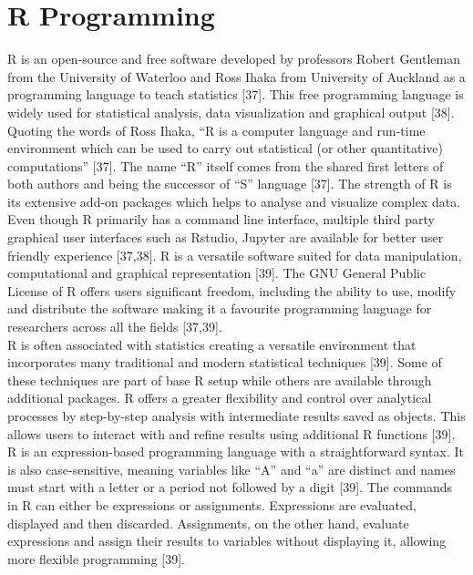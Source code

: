 \documentclass[12pt,a4paper]{article}
\begin{document}
\section{R Programming}
R is an open-source and free software developed by professors Robert Gentleman from the University of Waterloo and Ross Ihaka from University of Auckland as a programming language to teach statistics [37]. This free programming language 
is widely used for statistical analysis, data visualization and graphical output [38]. Quoting the words of Ross Ihaka, “R is a computer language and run-time environment which can be used to carry out statistical (or other quantitative) computations” [37]. 
The name “R” itself comes from the shared first letters of both authors and being the successor of “S” language [37]. The strength of R is its extensive add-on packages which helps to analyse and visualize complex data. Even though R primarily has a command 
line interface, multiple third party graphical user interfaces such as Rstudio, Jupyter are available for better user friendly experience [37,38]. R is a versatile software suited for data manipulation, computational and graphical representation [39]. The GNU General 
Public License of R offers users significant freedom, including the ability to use, modify and distribute the software making it a favourite programming language for researchers across all the fields [37,39]. \\

R is often associated with statistics creating a versatile environment that incorporates many traditional and modern statistical techniques [39]. Some of these techniques are part of base R setup while others are available through additional packages. R offers a greater flexibility and control over analytical 
processes by step-by-step analysis with intermediate results saved as objects. This allows users to interact with and refine results using additional R functions [39].
R is an expression-based programming language with a straightforward syntax. It is also case-sensitive, meaning variables like “A” and “a” are distinct and names must start with a letter or a period not followed by a digit [39]. The commands in R can either be expressions or assignments. 
Expressions are evaluated, displayed and then discarded. Assignments, on the other hand, evaluate expressions and assign their results to variables without displaying it, allowing more flexible programming [39]. \\
\end{document}
